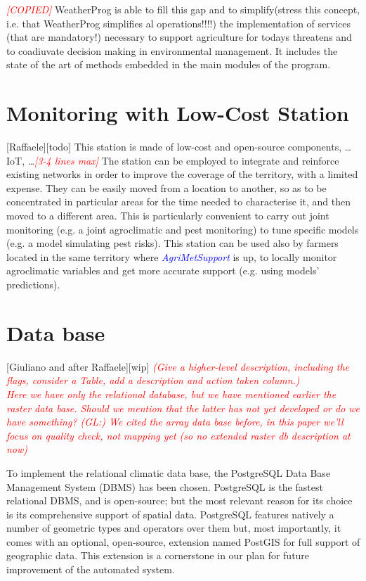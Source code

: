 \documentclass[authoryear,preprint,review,12pt]{elsarticle}
\newcommand{\note}[1]{\emph{\textcolor{red}{#1}}}
\newcommand{\update}[1]{\emph{\textcolor{blue}{#1}}}
\newcommand{\gci}{\update{AgriMetSupport}\xspace}
\begin{document}
\note{[COPIED]} WeatherProg is able to fill this gap and to simplify(stress this concept, i.e. that WeatherProg simplifies al operations!!!!) the implementation of services (that are mandatory!) necessary to support agriculture for todays threatens and to coadiuvate decision making in environmental management. It includes the state of the art of methods embedded in the main modules of the program.

\appendix

\section{Monitoring with Low-Cost Station}[Raffaele][todo]
This station is made of low-cost and open-source components, \ldots IoT, \dots \note{[3-4 lines max]} The station can be employed to integrate and reinforce existing networks in order to improve the coverage of the territory, with a limited expense. They can be easily moved from a location to another, so as to be concentrated in particular areas for the time needed to characterise it, and then moved to a different area. This is particularly convenient to carry out joint monitoring (e.g. a  joint agroclimatic and pest monitoring) to tune specific models (e.g. a model simulating pest risks). This station can be used also by farmers located in the same territory where \gci is up, to locally monitor agroclimatic variables and get more accurate support (e.g. using models' predictions).

\section{Data base}[Giuliano and after Raffaele][wip]
\note{(Give a higher-level description, including the flags, consider a Table, add a description and action taken column.)}\\
\note{Here we have only the relational database, but we have mentioned earlier the raster data base. Should we mention that the latter has not yet developed or do we have something? (GL:) We cited the array data base before, in this paper we'll focus on quality check, not mapping yet (so no extended raster db description at now)}

To implement the relational climatic data base, the PostgreSQL Data Base Management System (DBMS) \citep{postgres:postgresql} has been chosen. PostgreSQL is the fastest relational DBMS, and is open-source; but the most relevant reason for its choice is its comprehensive support of spatial data. PostgreSQL features natively a number of geometric types and operators over them but, most importantly, it comes with an optional, open-source, extension named PostGIS  \citep{postgis:postgis} for full support of geographic data. This extension is a cornerstone in our plan for future improvement of the automated system.
\end{document}
